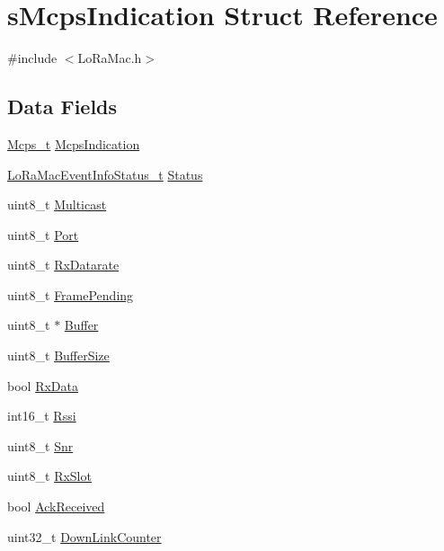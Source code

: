 \hypertarget{structsMcpsIndication}{}\section{s\+Mcps\+Indication Struct Reference}
\label{structsMcpsIndication}


{\ttfamily \#include $<$Lo\+Ra\+Mac.\+h$>$}

\subsection*{Data Fields}
\begin{DoxyCompactItemize}
\item 
\hyperlink{group__LORAMAC_ga670d0c87a52aeb13391f303a4cf94f00}{Mcps\+\_\+t} \hyperlink{structsMcpsIndication_a34ed414944a8a43156b9c8c7268c3895}{Mcps\+Indication}
\item 
\hyperlink{group__LORAMAC_gac6ffc346a4c767f7a743c87a686c51b4}{Lo\+Ra\+Mac\+Event\+Info\+Status\+\_\+t} \hyperlink{structsMcpsIndication_a8a63a10eb4bd7084254fa3b5a3387f3c}{Status}
\item 
uint8\+\_\+t \hyperlink{structsMcpsIndication_a8de16d5b205f8dceb556f52fbe09773e}{Multicast}
\item 
uint8\+\_\+t \hyperlink{structsMcpsIndication_ac7124ef78e2ea10129a5ae8686c25b03}{Port}
\item 
uint8\+\_\+t \hyperlink{structsMcpsIndication_a8a3558e639f91fe754ae8ad48eccfe75}{Rx\+Datarate}
\item 
uint8\+\_\+t \hyperlink{structsMcpsIndication_a0e1bffc7331a4bec0cf8dbc6fd5ddf84}{Frame\+Pending}
\item 
uint8\+\_\+t $\ast$ \hyperlink{structsMcpsIndication_a21a2c04aa780df05b1cf2d772d717536}{Buffer}
\item 
uint8\+\_\+t \hyperlink{structsMcpsIndication_a8a7bb5663ddffd2563dd81a572f2cd2b}{Buffer\+Size}
\item 
bool \hyperlink{structsMcpsIndication_a898027b196e3e06aebac0e4426b9fb17}{Rx\+Data}
\item 
int16\+\_\+t \hyperlink{structsMcpsIndication_ab4d689cea2a22d139ec49950b93be280}{Rssi}
\item 
uint8\+\_\+t \hyperlink{structsMcpsIndication_a408da739421acbaba81eab1836a432ed}{Snr}
\item 
uint8\+\_\+t \hyperlink{structsMcpsIndication_a4195cf722b69ed87681f2db540d4c456}{Rx\+Slot}
\item 
bool \hyperlink{structsMcpsIndication_af317a7cf2f1d961a46bde24a2b347964}{Ack\+Received}
\item 
uint32\+\_\+t \hyperlink{structsMcpsIndication_ae0fcbde0ad8f567c0f4e809accdeb688}{Down\+Link\+Counter}
\end{DoxyCompactItemize}



